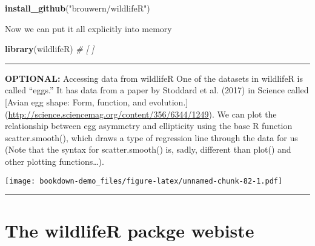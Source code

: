 \documentclass[]{book}
\newenvironment{Shaded}{\begin{snugshade}}{\end{snugshade}}
\newcommand{\KeywordTok}[1]{\textcolor[rgb]{0.13,0.29,0.53}{\textbf{#1}}}
\newcommand{\StringTok}[1]{\textcolor[rgb]{0.31,0.60,0.02}{#1}}
\newcommand{\CommentTok}[1]{\textcolor[rgb]{0.56,0.35,0.01}{\textit{#1}}}
\newcommand{\OperatorTok}[1]{\textcolor[rgb]{0.81,0.36,0.00}{\textbf{#1}}}
\newcommand{\NormalTok}[1]{#1}
\theoremstyle{definition}
\theoremstyle{definition}
\theoremstyle{definition}
\theoremstyle{remark}
\begin{document}
\begin{Shaded}
\begin{Highlighting}[]
\KeywordTok{install_github}\NormalTok{(}\StringTok{"brouwern/wildlifeR"}\NormalTok{)}
\end{Highlighting}
\end{Shaded}

Now we can put it all explicitly into memory

\begin{Shaded}
\begin{Highlighting}[]
\KeywordTok{library}\NormalTok{(wildlifeR) }\CommentTok{# [ ] }
\end{Highlighting}
\end{Shaded}

\begin{center}\rule{0.5\linewidth}{\linethickness}\end{center}

\textbf{OPTIONAL:} Accessing data from wildlifeR One of the datasets in
wildlifeR is called ``eggs.'' It has data from a paper by Stoddard et
al. (2017) in Science called {[}Avian egg shape: Form, function, and
evolution.{]}
(\url{http://science.sciencemag.org/content/356/6344/1249}). We can plot
the relationship between egg asymmetry and ellipticity using the base R
function scatter.smooth(), which draws a type of regression line through
the data for us (Note that the syntax for scatter.smooth() is, sadly,
different than plot() and other plotting functions\ldots{}).

\begin{Shaded}
\end{Shaded}

\texttt{[image: bookdown-demo\_files/figure-latex/unnamed-chunk-82-1.pdf]}

\begin{center}\rule{0.5\linewidth}{\linethickness}\end{center}

\section{\texorpdfstring{\protect\hyperlink{section-3}{} The wildlifeR
packge
webiste}{ The wildlifeR packge webiste}}\label{the-wildlifer-packge-webiste}
\end{document}
